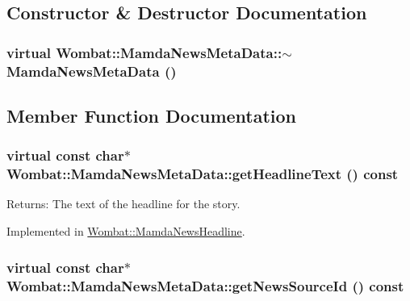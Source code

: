 \subsection{Constructor \& Destructor Documentation}
\hypertarget{classWombat_1_1MamdaNewsMetaData_3435e4bd338604cebfb3f5c6a34ad090}{
\subsubsection[$\sim$MamdaNewsMetaData]{\setlength{\rightskip}{0pt plus 5cm}virtual Wombat::Mamda\-News\-Meta\-Data::$\sim$Mamda\-News\-Meta\-Data ()}}
\label{classWombat_1_1MamdaNewsMetaData_3435e4bd338604cebfb3f5c6a34ad090}




\subsection{Member Function Documentation}
\hypertarget{classWombat_1_1MamdaNewsMetaData_c80a30c0b95497091c32972658ab4340}{
\subsubsection[getHeadlineText]{\setlength{\rightskip}{0pt plus 5cm}virtual const char$\ast$ Wombat::Mamda\-News\-Meta\-Data::get\-Headline\-Text () const}}
\label{classWombat_1_1MamdaNewsMetaData_c80a30c0b95497091c32972658ab4340}


\begin{Desc}
\item[Returns:]The text of the headline for the story. \end{Desc}


Implemented in \hyperlink{classWombat_1_1MamdaNewsHeadline_7c4c336c485773a27dd12ccbc93bcfce}{Wombat::Mamda\-News\-Headline}.\hypertarget{classWombat_1_1MamdaNewsMetaData_bc4fae00154c4b27324e1da1d25585ce}{
\subsubsection[getNewsSourceId]{\setlength{\rightskip}{0pt plus 5cm}virtual const char$\ast$ Wombat::Mamda\-News\-Meta\-Data::get\-News\-Source\-Id () const}}
\label{classWombat_1_1MamdaNewsMetaData_bc4fae00154c4b27324e1da1d25585ce}


